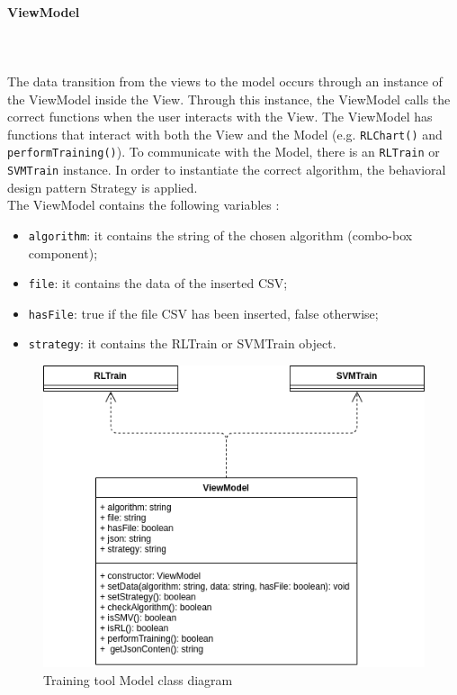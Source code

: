 \paragraph{ViewModel}\mbox{} \\ \mbox{} \\
The data transition from the views to the model occurs through an instance of the ViewModel inside the View. Through this instance, the ViewModel calls the correct functions when the user interacts with the View.
The ViewModel has functions that interact with both the View and the Model (e.g. \texttt{RLChart()} and \texttt{performTraining()}).
To communicate with the Model, there is an \texttt{RLTrain} or \texttt{SVMTrain} instance. In order to instantiate the correct algorithm, the behavioral design pattern Strategy is applied. \\
The ViewModel contains the following variables	: \begin{itemize}
\item \texttt{algorithm}: it contains the string of the chosen algorithm (combo-box component);
\item \texttt{file}: it contains the data of the inserted CSV;
\item \texttt{hasFile}: true if the file CSV has been inserted, false otherwise;
\item \texttt{strategy}: it contains the RLTrain or SVMTrain object.
\end{itemize}

\begin{figure}[H]
\centering
\includegraphics[scale=0.6]{../../../Diagrams/Classes_diagrams/tool_modelview.png}
\caption{Training tool Model class diagram}
\end{figure}

